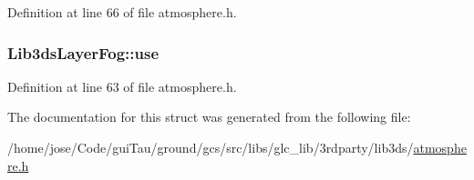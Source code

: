 Definition at line 66 of file atmosphere.\-h.

\hypertarget{struct_lib3ds_layer_fog_aaef3366f01220676028c2c7ece753fbe}{
\subsubsection[{use}]{ Lib3ds\-Layer\-Fog\-::use}}\label{struct_lib3ds_layer_fog_aaef3366f01220676028c2c7ece753fbe}


Definition at line 63 of file atmosphere.\-h.



The documentation for this struct was generated from the following file\-:\begin{DoxyCompactItemize}
\item 
/home/jose/\-Code/gui\-Tau/ground/gcs/src/libs/glc\-\_\-lib/3rdparty/lib3ds/\hyperlink{atmosphere_8h}{atmosphere.\-h}\end{DoxyCompactItemize}
